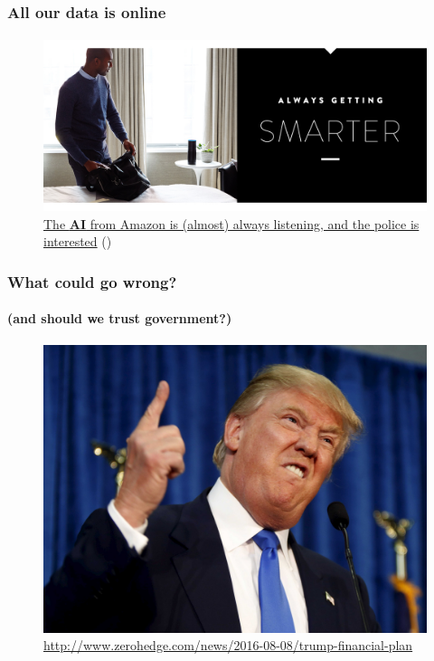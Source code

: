	\begin{frame}
	\frametitle{All our data is online}
	\framesubtitle{}
	        \begin{figure}[h]
                \centering
                \includegraphics[width=.8\textwidth]{../pics/alexa-feature-smarter}
		\caption{\href{http://www.forbes.com/sites/tonybradley/2017/01/05/alexa-is-listening-but-amazon-values-privacy-and-gives-you-control/\#7c920725eed5}{The \textbf{AI} from Amazon is (almost) always listening, and the police is interested} (\cite{bradley2017})}
        	\end{figure}
	\end{frame}

	\begin{frame}
	\frametitle{What could go wrong?}
	\framesubtitle{(and should we trust government?)}
	        \begin{figure}[h]
                \centering
                \includegraphics[width=.8\textwidth]{../pics/Trump_fingerup}
		\caption{\tiny\url{http://www.zerohedge.com/news/2016-08-08/trump-financial-plan}}
        	\end{figure}
	\end{frame}


